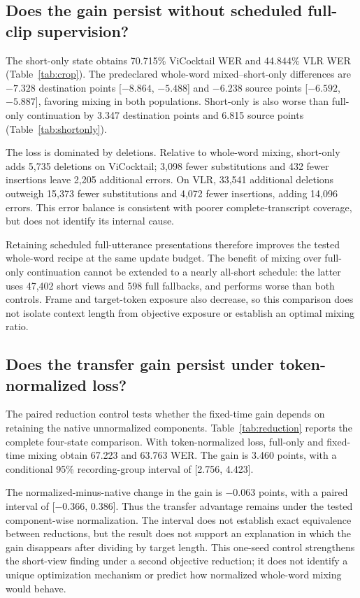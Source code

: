 \subsection{Does the gain persist without scheduled full-clip supervision?}
\label{sec:shortonlyresults}
The short-only state obtains 70.715\% ViCocktail WER and 44.844\% VLR WER
(Table~\ref{tab:crop}). The predeclared whole-word mixed--short-only differences
are $-7.328$ destination points [${-8.864}$, ${-5.488}$] and $-6.238$ source
points [${-6.592}$, ${-5.887}$], favoring mixing in both populations.
Short-only is also worse than full-only continuation by 3.347 destination
points and 6.815 source points (Table~\ref{tab:shortonly}).



The loss is dominated by deletions. Relative to whole-word mixing, short-only
adds 5,735 deletions on ViCocktail; 3,098 fewer substitutions and 432 fewer
insertions leave 2,205 additional errors. On VLR, 33,541 additional deletions
outweigh 15,373 fewer substitutions and 4,072 fewer insertions, adding 14,096
errors. This error balance is consistent with poorer complete-transcript coverage,
but does not identify its internal cause.

Retaining scheduled full-utterance presentations therefore improves the tested
whole-word recipe at the same update budget. The benefit of mixing over full-only
continuation cannot be extended to a nearly all-short schedule: the latter uses
47,402 short views and 598 full fallbacks, and performs worse than both controls.
Frame and target-token exposure also decrease, so this comparison does not
isolate context length from objective exposure or establish an optimal mixing ratio.

\subsection{Does the transfer gain persist under token-normalized loss?}
\label{sec:lossresults}
The paired reduction control tests whether the fixed-time gain depends on
retaining the native unnormalized components. Table~\ref{tab:reduction} reports
the complete four-state comparison. With token-normalized loss, full-only and
fixed-time mixing obtain 67.223 and 63.763 WER. The gain is 3.460 points,
with a conditional 95\% recording-group interval of [2.756, 4.423].



The normalized-minus-native change in the gain is $-0.063$ points, with a
paired interval of [$-0.366$, 0.386]. Thus the transfer advantage remains under
the tested component-wise normalization. The interval does not establish exact
equivalence between reductions, but the result does not support an explanation
in which the gain disappears after dividing by target length. This one-seed
control strengthens the short-view finding under a second objective reduction;
it does not identify a unique optimization mechanism or predict how normalized
whole-word mixing would behave.

